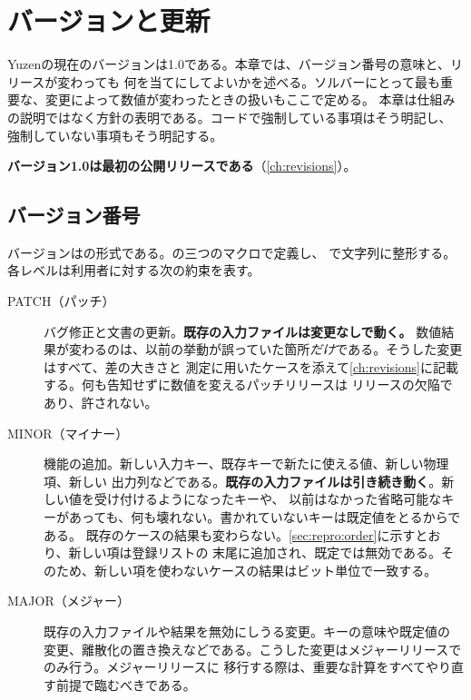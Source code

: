\chapter{バージョンと更新}
\label{ch:policy}

Yuzenの現在のバージョンは1.0である。本章では、バージョン番号の意味と、リリースが変わっても
何を当てにしてよいかを述べる。ソルバーにとって最も重要な、変更によって数値が変わったときの扱いもここで定める。
本章は仕組みの説明ではなく方針の表明である。コードで強制している事項はそう明記し、
強制していない事項もそう明記する。

\textbf{バージョン1.0は最初の公開リリースである}（\cref{ch:revisions}）。

\section{バージョン番号}
\label{sec:policy:scheme}

バージョンはの形式である。の三つのマクロで定義し、
で文字列に整形する。各レベルは利用者に対する次の約束を表す。

\begin{description}

  \item[PATCH（パッチ）] バグ修正と文書の更新。\textbf{既存の入力ファイルは変更なしで動く。}
    数値結果が変わるのは、以前の挙動が誤っていた箇所\emph{だけ}である。そうした変更はすべて、差の大きさと
    測定に用いたケースを添えて\cref{ch:revisions}に記載する。何も告知せずに数値を変えるパッチリリースは
    リリースの欠陥であり、許されない。

  \item[MINOR（マイナー）] 機能の追加。新しい入力キー、既存キーで新たに使える値、新しい物理項、新しい
    出力列などである。\textbf{既存の入力ファイルは引き続き動く}。新しい値を受け付けるようになったキーや、
    以前はなかった省略可能なキーがあっても、何も壊れない。書かれていないキーは既定値をとるからである。
    既存のケースの結果も変わらない。\cref{sec:repro:order}に示すとおり、新しい項は登録リストの
    末尾に追加され、既定では無効である。そのため、新しい項を使わないケースの結果はビット単位で一致する。

  \item[MAJOR（メジャー）] 既存の入力ファイルや結果を無効にしうる変更。キーの意味や既定値の
    変更、離散化の置き換えなどである。こうした変更はメジャーリリースでのみ行う。メジャーリリースに
    移行する際は、重要な計算をすべてやり直す前提で臨むべきである。

\end{description}

